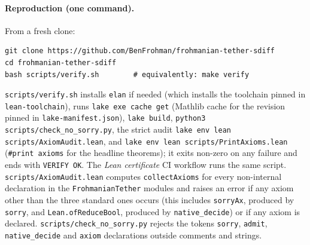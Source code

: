 \documentclass[11pt,a4paper]{article}
\theoremstyle{plain}
\theoremstyle{definition}
\theoremstyle{remark}
\begin{document}
\paragraph{Reproduction (one command).} From a fresh clone:
\begin{Verbatim}
git clone https://github.com/BenFrohman/frohmanian-tether-sdiff
cd frohmanian-tether-sdiff
bash scripts/verify.sh        # equivalently: make verify
\end{Verbatim}
\texttt{scripts/verify.sh} installs \texttt{elan} if needed (which installs the toolchain pinned in
\texttt{lean-toolchain}), runs \texttt{lake exe cache get} (Mathlib cache for the revision pinned in
\texttt{lake-manifest.json}), \texttt{lake build}, \texttt{python3 scripts/check\_no\_sorry.py}, the strict audit
\texttt{lake env lean scripts/AxiomAudit.lean}, and \texttt{lake env lean scripts/PrintAxioms.lean}
(\texttt{\#print axioms} for the headline theorems); it exits non-zero on any failure and ends with
\texttt{VERIFY OK}. The \emph{Lean certificate} CI workflow runs the same script.
\texttt{scripts/AxiomAudit.lean} computes \texttt{collectAxioms} for every non-internal declaration in the
\texttt{FrohmanianTether} modules and raises an error if any axiom other than the three standard ones occurs
(this includes \texttt{sorryAx}, produced by \texttt{sorry}, and \texttt{Lean.ofReduceBool}, produced by
\texttt{native\_decide}) or if any axiom is declared. \texttt{scripts/check\_no\_sorry.py} rejects the tokens
\texttt{sorry}, \texttt{admit}, \texttt{native\_decide} and \texttt{axiom} declarations outside comments and
strings.
\end{document}
